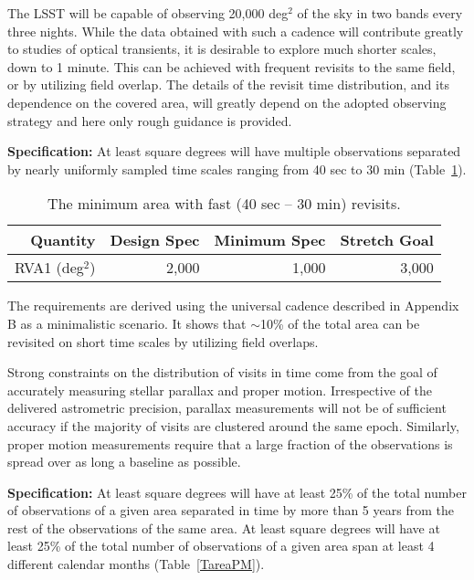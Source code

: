 The LSST will be capable of observing 20,000 deg$^2$ of the sky in two
bands every three nights. While the data obtained with such a cadence will
contribute greatly to studies of optical transients, it is desirable to
explore much shorter scales, down to 1 minute. This can be achieved with
frequent revisits to the same field, or by utilizing field overlap.  The
details of the revisit time distribution, and its dependence on the covered
area, will greatly depend on the adopted observing strategy and here only
rough guidance is provided.

{\bf Specification:} At least
square degrees will have multiple observations separated by nearly uniformly
sampled time scales ranging from 40 sec to 30 min (Table~\ref{TfastArea}).

\begin{table}[h]
\begin{tabular}{|r|r|r|r|}
\hline
Quantity            & Design Spec & Minimum Spec & Stretch Goal     \\
\hline
  RVA1  (deg$^2$)   &  2,000      &  1,000       &     3,000        \\
\hline
\end{tabular}
\caption{The minimum area with fast (40 sec -- 30 min) revisits.}
\label{TfastArea}
\end{table}

The requirements are derived using the universal cadence described in
Appendix B as a minimalistic scenario. It shows that $\sim$10\% of the
total area can be revisited on short time scales by utilizing field
overlaps.

Strong constraints on the distribution of visits in time come from the goal
of accurately measuring stellar parallax and proper motion. Irrespective of
the delivered astrometric precision, parallax measurements will not be of
sufficient accuracy if the majority of visits are clustered around the same
epoch.  Similarly, proper motion measurements require that a large fraction
of the observations is spread over as long a baseline as possible.

{\bf Specification:} At least
square degrees will have at least 25\% of the total number of observations
of a given area separated in time by more than 5 years from the rest of the
observations of the same area. At least
square degrees will have at least 25\% of the total number of observations
of a given area span at least 4 different calendar months (Table~\ref{TareaPM}).

